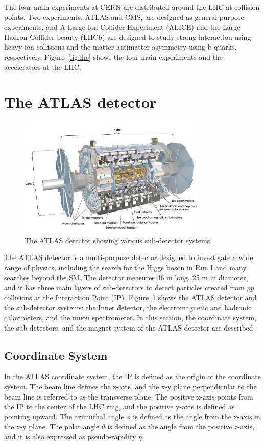 The four main experiments at CERN are distributed around the LHC at collision points. Two experiments, ATLAS and CMS, are designed as general purpose experiments, and A Large Ion Collider Experiment (ALICE) and the Large Hadron Collider beauty (LHCb) are designed to study strong interaction using heavy ion collisions and the matter-antimatter asymmetry using b quarks, respectively. Figure~\ref{fig:lhc} shows the four main experiments and the accelerators at the LHC.


\section{The ATLAS detector}
\label{sec:atlas:detector}

\begin{figure}[!htb]
    \includegraphics[width=0.8\textwidth]{figures/atlas.png}
    \centering
    \caption{The ATLAS detector showing various sub-detector systems.}
    \label{fig:atlas}
\end{figure}

The ATLAS detector is a multi-purpose detector designed to investigate a wide range of physics, including the search for the Higgs boson in Run I and many searches beyond the SM. The detector measures 46 m long, 25 m in diameter, and it has three main layers of sub-detectors to detect particles created from $pp$ collisions at the Interaction Point (IP). Figure~\ref{fig:atlas} shows the ATLAS detector and the sub-detector systems: the Inner detector, the electromagnetic and hadronic calorimeters, and the muon spectrometer. In this section, the coordinate system, the sub-detectors, and the magnet system of the ATLAS detector are described.

\subsection{Coordinate System}
\label{sec:atlas:coordinate}
In the ATLAS coordinate system, the IP is defined as the origin of the coordinate system. The beam line defines the z-axis, and the x-y plane perpendicular to the beam line is referred to as the transverse plane. The positive x-axis points from the IP to the center of the LHC ring, and the positive y-axis is defined as pointing upward. The azimuthal angle $\phi$ is defined as the angle from the x-axis in the x-y plane. The polar angle $\theta$ is defined as the angle from the positive z-axis, and it is also expressed as pseudo-rapidity $\eta$,


